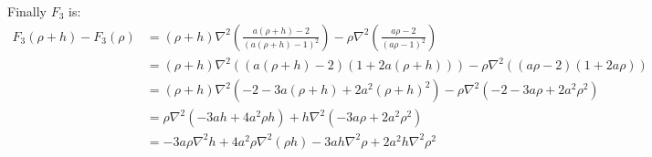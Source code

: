 \documentclass[11pt, a4paper]{article}
\theoremstyle{definition}
\begin{document}
Finally $F_3$ is:
\begin{align*}
F_3(\rho + h) - F_3 (\rho) &= (\rho + h) \nabla^2 \left(\frac{a (\rho + h) - 2}{(a (\rho + h) - 1)^2}\right) - \rho \nabla^2 \left(\frac{a \rho - 2}{(a \rho - 1)^2}\right)\\
&= (\rho + h) \nabla^2 \left( (a (\rho + h) - 2) ( 1 + 2a(\rho +h)) \right) - \rho \nabla^2 \left((a \rho - 2) (1 + 2a \rho) \right)\\
&= (\rho + h) \nabla^2 \left( -2 -3a(\rho + h) + 2a^2 (\rho + h)^2 \right) - \rho \nabla^2 \left(-2 -3a \rho + 2a^2 \rho^2\right)\\
&= \rho \nabla^2 \left( - 3ah + 4a^2 \rho h  \right) + h \nabla^2 \left(-3a \rho  + 2a^2 \rho^2 \right)\\
&= - 3a \rho \nabla ^2 h + 4a^2 \rho \nabla^2(\rho h) - 3ah \nabla^2 \rho + 2a^2 h \nabla^2 \rho^2
\end{align*}
\end{document}
